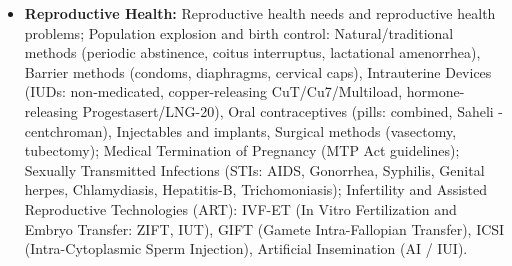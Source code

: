 \documentclass[11pt,a4paper]{article}
\begin{document}
\begin{itemize}
  \item \textbf{Reproductive Health:} Reproductive health needs and reproductive health problems; Population explosion and birth control: Natural/traditional methods (periodic abstinence, coitus interruptus, lactational amenorrhea), Barrier methods (condoms, diaphragms, cervical caps), Intrauterine Devices (IUDs: non-medicated, copper-releasing CuT/Cu7/Multiload, hormone-releasing Progestasert/LNG-20), Oral contraceptives (pills: combined, Saheli - centchroman), Injectables and implants, Surgical methods (vasectomy, tubectomy); Medical Termination of Pregnancy (MTP Act guidelines); Sexually Transmitted Infections (STIs: AIDS, Gonorrhea, Syphilis, Genital herpes, Chlamydiasis, Hepatitis-B, Trichomoniasis); Infertility and Assisted Reproductive Technologies (ART): IVF-ET (In Vitro Fertilization and Embryo Transfer: ZIFT, IUT), GIFT (Gamete Intra-Fallopian Transfer), ICSI (Intra-Cytoplasmic Sperm Injection), Artificial Insemination (AI / IUI).
\end{itemize}
\end{document}
